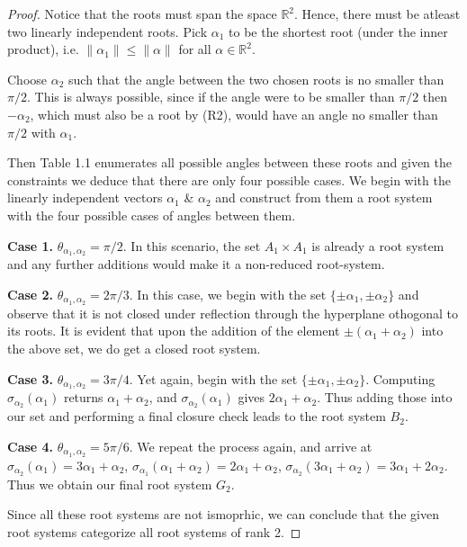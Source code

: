 \begin{proof}
    Notice that the roots must span the space $\mathbb{R}^2$. Hence, there must be atleast two linearly independent roots.
    Pick $\alpha_1$ to be the shortest root (under the inner product), i.e. $\|\alpha_1\| \leq \|\alpha\|$ for all 
    $\alpha \in \mathbb{R}^2$. \newline
    
    Choose $\alpha_2$ such that the angle between the two chosen roots is no smaller than $\pi / 2$.
    This is always possible, since if the angle were to be smaller than $\pi / 2$ then $-\alpha_2$, which must also be a root by (R2),
    would have an angle no smaller than $\pi/2$ with $\alpha_1$. \newline
    
    Then Table 1.1 enumerates all possible angles between these roots and given the constraints we deduce that there are only four
    possible cases. We begin with the linearly independent vectors $\alpha_1$ \& $\alpha_2$ and construct from them a root system
    with the four possible cases of angles between them. \newline

    \textbf{Case 1.} $\theta_{\alpha_1, \alpha_2} = \pi / 2$.
    In this scenario, the set $A_1 \times A_1$ is already a root system and any further additions would make it a
    non-reduced root-system. \newline

    \textbf{Case 2.} $\theta_{\alpha_1, \alpha_2} = 2\pi / 3$.
    In this case, we begin with the set $\{\pm \alpha_1, \pm \alpha_2 \}$ and observe that it is not closed under reflection
    through the hyperplane othogonal to its roots.
    It is evident that upon the addition of the element $\pm (\alpha_1 + \alpha_2)$ into the above set, we do get a
    closed root system. \newline

    \textbf{Case 3.} $\theta_{\alpha_1, \alpha_2} = 3\pi / 4$.
    Yet again, begin with the set $\{\pm \alpha_1, \pm \alpha_2 \}$. Computing $\sigma_{\alpha_2}(\alpha_1)$ returns 
    $\alpha_1 + \alpha_2$, and $\sigma_{\alpha_2}(\alpha_1)$ gives $2\alpha_1 + \alpha_2$. Thus adding those into our set
    and performing a final closure check leads to the root system $B_2$. \newline

    \textbf{Case 4.} $\theta_{\alpha_1, \alpha_2} = 5\pi / 6$.
    We repeat the process again, and arrive at 
        $\sigma_{\alpha_2}(\alpha_1) = 3\alpha_1 + \alpha_2$,
        $\sigma_{\alpha_1}(\alpha_1 + \alpha_2) = 2 \alpha_1 + \alpha_2$,
        $\sigma_{\alpha_2}(3 \alpha_1 + \alpha_2) = 3 \alpha_1 + 2 \alpha_2$.
        Thus we obtain our final root system $G_2$.
    
    Since all these root systems are not ismoprhic, we can conclude that the
    given root systems categorize all root systems of rank 2.
\end{proof}

